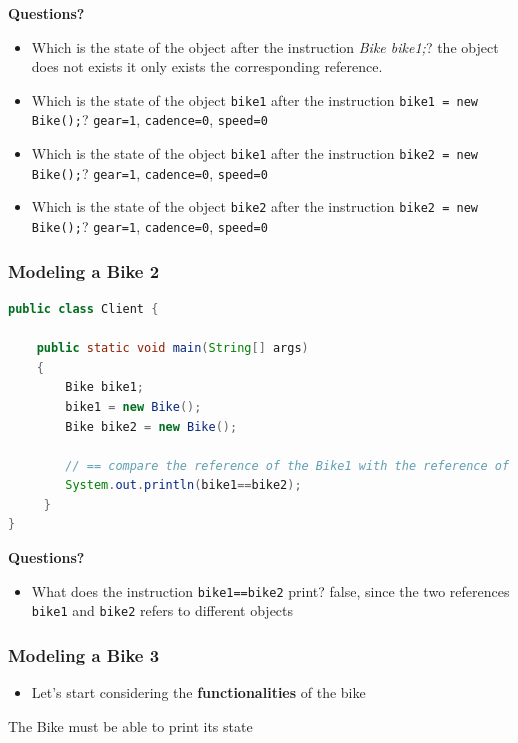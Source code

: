 \documentclass{article}
\theoremstyle{definition}
\begin{document}
\textbf{Questions?}\\
\begin{itemize}
\item Which is the state of the object after the instruction \emph{Bike bike1;}? the object does not exists it only exists the corresponding reference.
\item Which is the state of the object \texttt{bike1} after the instruction \texttt{bike1 = new Bike();}? \texttt{gear=1}, \texttt{cadence=0}, \texttt{speed=0}
\item Which is the state of the object \texttt{bike1} after the instruction \texttt{bike2 = new Bike();}? \texttt{gear=1}, \texttt{cadence=0}, \texttt{speed=0}
\item Which is the state of the object \texttt{bike2} after the instruction \texttt{bike2 = new Bike();}? \texttt{gear=1}, \texttt{cadence=0}, \texttt{speed=0}
\end{itemize}



\subsubsection{Modeling a Bike 2}
\begin{lstlisting}[language=Java,escapechar=|]
public class Client {
	
	public static void main(String[] args)
    {
        Bike bike1; 
        bike1 = new Bike();
        Bike bike2 = new Bike(); 
        
        // == compare the reference of the Bike1 with the reference of the Bike2
        System.out.println(bike1==bike2);
     }
}
\end{lstlisting}

\textbf{Questions?}\\
\begin{itemize}
\item What does the instruction \texttt{bike1==bike2} print? false, since the two references \texttt{bike1} and \texttt{bike2} refers to different objects
\end{itemize}

\subsubsection{Modeling a Bike 3}
\begin{itemize}
\item Let's start considering the \textbf{functionalities} of the bike
\end{itemize}
The Bike must be able to print its state
\end{document}
